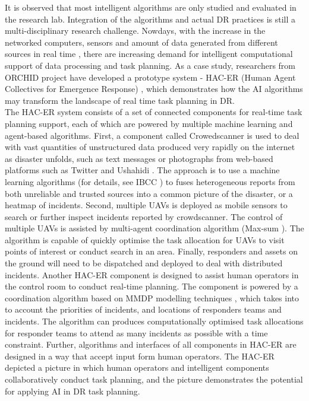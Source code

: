 It is observed that most intelligent algorithms are only studied and evaluated in the research lab. Integration of the algorithms and actual \ac{DR} practices is still a multi-disciplinary research challenge. Nowdays, with the increase in the networked computers, sensors and amount of data generated from different sources in real time \cite{Ramchurn2015}, there are increasing demand for intelligent computational support of data processing and task planning. As a case study, researchers from ORCHID project have developed a prototype system - HAC-ER (Human Agent Collectives for Emergence Response) \cite{Jennings2014,Ramchurn2015,Ramchurn2015a}, which demonstrates how the \ac{AI} algorithms may transform the landscape of real time task planning in \ac{DR}.\\

The \ac{HAC-ER} system consists of a set of connected components for real-time task planning support, each of which are powered by multiple machine learning and agent-based algorithms. First, a component called Crowedscanner is used to deal with vast quantities of unstructured data produced very rapidly on the internet as disaster unfolds, such as text messages or photographs from web-based platforms such as Twitter and Ushahidi \cite{Morrow2011}. The approach is to use a machine learning algorithms (for details, see IBCC \cite{Simpson}) to fuses heterogeneous reports from both unreliable and trusted sources into a common picture of the disaster, or a heatmap of incidents. Second, multiple  \acf{UAV}s is deployed as mobile sensors to search or further inspect incidents reported by crowdscanner. The control of multiple \ac{UAV}s is assisted by multi-agent coordination algorithm (Max-sum \cite{Ramchurn2010}). The algorithm is capable of quickly optimise the task allocation for \ac{UAV}s to visit points of interest or conduct search in an area.  Finally, responders and assets on the ground will need to be dispatched and deployed to deal with distributed incidents. Another \ac{HAC-ER} component is designed to assist human operators in the control room to conduct real-time planning. The component is powered by a coordination algorithm based on MMDP modelling techniques \cite{Wu2015}, which takes into to account the priorities of incidents, and locations of responders teams and incidents. The algorithm can produces computationally optimised task allocations for responder teams to attend as many incidents as possible with a time constraint. Further, algorithms and interfaces of all components in \ac{HAC-ER} are designed in a way that accept input form human operators. The \ac{HAC-ER} depicted a picture in which human operators and intelligent components collaboratively conduct task planning, and the picture demonstrates the potential for applying \ac{AI} in \ac{DR} task planning.\\

